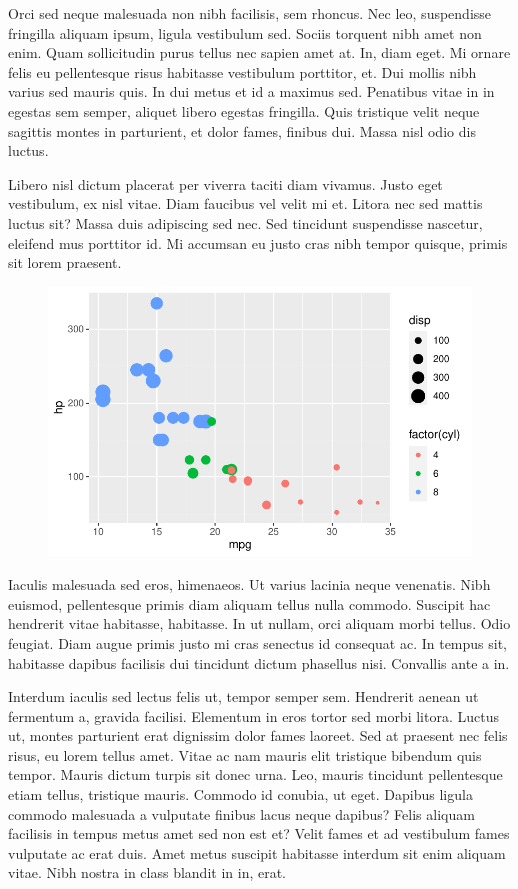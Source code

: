 \documentclass[
  9pt,
  letterpaper,
  DIV=11,
  numbers=noendperiod]{scrartcl}
\begin{document}
Orci sed neque malesuada non nibh facilisis, sem rhoncus. Nec leo,
suspendisse fringilla aliquam ipsum, ligula vestibulum sed. Sociis
torquent nibh amet non enim. Quam sollicitudin purus tellus nec sapien
amet at. In, diam eget. Mi ornare felis eu pellentesque risus habitasse
vestibulum porttitor, et. Dui mollis nibh varius sed mauris quis. In dui
metus et id a maximus sed. Penatibus vitae in in egestas sem semper,
aliquet libero egestas fringilla. Quis tristique velit neque sagittis
montes in parturient, et dolor fames, finibus dui. Massa nisl odio dis
luctus.

Libero nisl dictum placerat per viverra taciti diam vivamus. Justo eget
vestibulum, ex nisl vitae. Diam faucibus vel velit mi et. Litora nec sed
mattis luctus sit? Massa duis adipiscing sed nec. Sed tincidunt
suspendisse nascetur, eleifend mus porttitor id. Mi accumsan eu justo
cras nibh tempor quisque, primis sit lorem praesent.

\begin{figure}\includegraphics{man_files/figure-pdf/fig-mtcars-wrapfig-1}

\end{figure}

Iaculis malesuada sed eros, himenaeos. Ut varius lacinia neque
venenatis. Nibh euismod, pellentesque primis diam aliquam tellus nulla
commodo. Suscipit hac hendrerit vitae habitasse, habitasse. In ut
nullam, orci aliquam morbi tellus. Odio feugiat. Diam augue primis justo
mi cras senectus id consequat ac. In tempus sit, habitasse dapibus
facilisis dui tincidunt dictum phasellus nisi. Convallis ante a in.

Interdum iaculis sed lectus felis ut, tempor semper sem. Hendrerit
aenean ut fermentum a, gravida facilisi. Elementum in eros tortor sed
morbi litora. Luctus ut, montes parturient erat dignissim dolor fames
laoreet. Sed at praesent nec felis risus, eu lorem tellus amet. Vitae ac
nam mauris elit tristique bibendum quis tempor. Mauris dictum turpis sit
donec urna. Leo, mauris tincidunt pellentesque etiam tellus, tristique
mauris. Commodo id conubia, ut eget. Dapibus ligula commodo malesuada a
vulputate finibus lacus neque dapibus? Felis aliquam facilisis in tempus
metus amet sed non est et? Velit fames et ad vestibulum fames vulputate
ac erat duis. Amet metus suscipit habitasse interdum sit enim aliquam
vitae. Nibh nostra in class blandit in in, erat.
\end{document}
